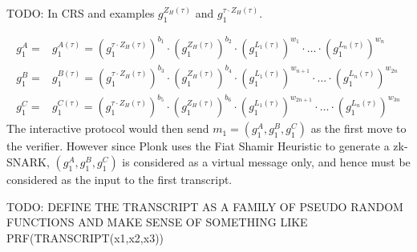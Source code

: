 TODO: In CRS and examples $g_1^{Z_H(\tau)}$ and $g_1^{\tau\cdot Z_H(\tau)}$.

\begin{equation}
\begin{array}{rl}
g_1^A = & g_1^{A(\tau)} = \left(g_1^{\tau\cdot Z_H(\tau)}\right)^{b_1}\cdot\left(g_1^{Z_H(\tau)}\right)^{b_2}\cdot \left(g_1^{L_1(\tau)}\right)^{w_1}\cdot\ldots\cdot \left(g_1^{L_n(\tau)}\right)^{w_n}\\
g_1^B = & g_1^{B(\tau)} = \left(g_1^{\tau\cdot Z_H(\tau)}\right)^{b_3}\cdot\left(g_1^{Z_H(\tau)}\right)^{b_4}\cdot \left(g_1^{L_1(\tau)}\right)^{w_{n+1}}\cdot\ldots\cdot \left(g_1^{L_n(\tau)}\right)^{w_{2n}}\\
g_1^C = & g_1^{C(\tau)} = \left(g_1^{\tau\cdot Z_H(\tau)}\right)^{b_5}\cdot\left(g_1^{Z_H(\tau)}\right)^{b_6}\cdot \left(g_1^{L_1(\tau)}\right)^{w_{2n+1}}\cdot\ldots\cdot \left(g_1^{L_n(\tau)}\right)^{w_{3n}}
\end{array}
\end{equation}
The interactive protocol would then send $m_1=(g_1^A, g_1^B, g_1^C)$ as the first move to the verifier. However since Plonk uses the Fiat Shamir Heuristic to generate a zk-SNARK, $(g_1^A, g_1^B, g_1^C)$ is considered as a virtual message only, and hence must be considered as the input to the first transcript.

TODO: DEFINE THE TRANSCRIPT AS A FAMILY OF PSEUDO RANDOM FUNCTIONS AND MAKE SENSE OF SOMETHING LIKE PRF(TRANSCRIPT(x1,x2,x3))

